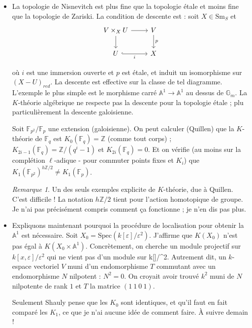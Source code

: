 \documentclass[11.8pt]{amsart}
\newcommand\Z{\mathbb{Z}}
\newcommand\Spec{\mathrm{Spec}}
\theoremstyle{plain}
\theoremstyle{definition}
\theoremstyle{remark}
\newtheorem*{rmq}{Remarque}
\begin{document}
\begin{itemize}
\item La topologie de Nisnevitch est plus fine que la topologie étale et moins fine que la topologie de Zariski. La condition de descente est : soit $X\in \mathrm{Sm}_S$ et %
\[\begin{tikzcd}
	{V\times_X U} & V \\
	U & X
	\arrow[from=1-1, to=1-2]
	\arrow[from=1-1, to=2-1]
	\arrow["p", from=1-2, to=2-2]
	\arrow["i"', hook, from=2-1, to=2-2]
\end{tikzcd}\]

où $i$ est une immersion ouverte et $p$ est étale, et induit un isomorphisme sur $(X-U)_{red}$. La descente est effective sur la classe de tel diagramme. L'exemple le plus simple est le morphisme carré $\mathbb A^1\to \mathbb A^1$ au dessus de $\mathbb G_m$. La $K$-théorie algébrique ne respecte pas la descente pour la topologie étale ; plu particulièrement la descente galoisienne. 

Soit $\mathbb F_{p^2}/\mathbb F_{p}$ une extension (galoisienne). On peut calculer (Quillen) que la $K$-théorie de $\mathbb F_{q}$ est $K_0(\mathbb F_{q}) = \mathbb Z$ (comme tout corps) ; $K_{2i-1}(\mathbb F_{q}) = \mathbb Z/(q^i-1)$ et $K_{2i}(\mathbb F_{q}) = 0$. Et on vérifie (au moins sur la complétion $\ell$-adique - pour commuter points fixes et $K_i$) que $K_1(\mathbb F_{p^2})^{h\Z/2} \ne K_1(\mathbb F_{p})$.

\begin{rmq} Un des seuls exemples explicite de $K$-théorie, due à Quillen. C'est difficile ! La notation $h\Z/2$ tient pour l'action homotopique de groupe. Je n'ai pas précisément compris comment ça fonctionne ; je n'en dis pas plus.
\end{rmq} 

\item Expliquons maintenant pourquoi la procédure de localisation pour obtenir la $\mathbb A^1$ est nécessaire. Soit $X_0 = \Spec(k[\varepsilon]/\varepsilon^2)$. J'affirme que $K(X_0)$ n'est pas égal à $K(X_0\times \mathbb A^1)$. Concrètement, on cherche un module projectif sur $k[x,\varepsilon]/\varepsilon^2$ qui ne vient pas d'un module sur k[\varepsilon]/\varepsilon^2. Autrement dit, un $k$-espace vectoriel $V$ muni d'un endomorphisme $T$ commutant avec un endomorphisme $N$ nilpotent : $N^2=0$. On croyait avoir trouvé $k^2$ muni de $N$ nilpotente de rank $1$ et $T$ la matrice $(1\ 1\ 0\ 1)$. 

Seulement Shauly pense que les $K_0$ sont identiques, et qu'il faut en fait comparé les $K_1$, ce que je n'ai aucune idée de comment faire. À suivre demain ! 
\end{itemize}
\end{document}
